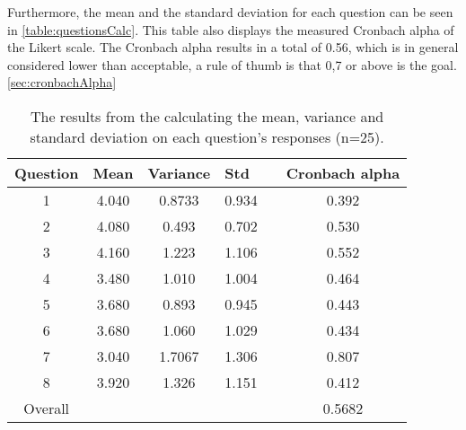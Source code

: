 Furthermore, the mean and the standard deviation for each question can be seen in \autoref{table:questionsCalc}. This table also displays the measured Cronbach alpha of the Likert scale. The Cronbach alpha results in a total of 0.56, which is in general considered lower than acceptable, a rule of thumb is that 0,7 or above is the goal.\autoref{sec:cronbachAlpha}
\begin{table}[H]
\centering
\caption{The results from the calculating the mean, variance and standard deviation on each question's responses (n=25).}
\label{table:questionsCalc}
\begin{tabular}{@{}cccclc@{}}
\toprule
\multicolumn{1}{l}{Question} & \multicolumn{1}{l}{Mean} & \multicolumn{1}{l}{Variance} & \multicolumn{1}{l}{Std} &  & \multicolumn{1}{l}{Cronbach alpha} \\ \midrule
1                            & 4.040                    & 0.8733                       & 0.934                   &  & 0.392                              \\
2                            & 4.080                    & 0.493                        & 0.702                   &  & 0.530                              \\
3                            & 4.160                    & 1.223                        & 1.106                   &  & 0.552                              \\
4                            & 3.480                    & 1.010                        & 1.004                   &  & 0.464                              \\
5                            & 3.680                    & 0.893                        & 0.945                   &  & 0.443                              \\
6                            & 3.680                    & 1.060                        & 1.029                   &  & 0.434                              \\
7                            & 3.040                    & 1.7067                       & 1.306                   &  & 0.807                              \\
8                            & 3.920                    & 1.326                        & 1.151                   &  & 0.412                              \\ \midrule
Overall                        & \multicolumn{1}{l}{}     & \multicolumn{1}{l}{}         & \multicolumn{1}{l}{}    &  & 0.5682                             \\ \bottomrule
\end{tabular}
\end{table}

